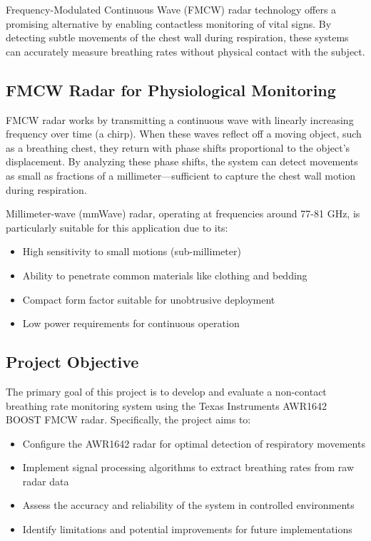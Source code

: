 \documentclass[12pt]{article}
\begin{document}
Frequency-Modulated Continuous Wave (FMCW) radar technology offers a promising alternative by enabling contactless monitoring of vital signs. By detecting subtle movements of the chest wall during respiration, these systems can accurately measure breathing rates without physical contact with the subject.

\subsection{FMCW Radar for Physiological Monitoring}
FMCW radar works by transmitting a continuous wave with linearly increasing frequency over time (a chirp). When these waves reflect off a moving object, such as a breathing chest, they return with phase shifts proportional to the object's displacement. By analyzing these phase shifts, the system can detect movements as small as fractions of a millimeter—sufficient to capture the chest wall motion during respiration.

Millimeter-wave (mmWave) radar, operating at frequencies around 77-81 GHz, is particularly suitable for this application due to its:
\begin{itemize}
    \item High sensitivity to small motions (sub-millimeter)
    \item Ability to penetrate common materials like clothing and bedding
    \item Compact form factor suitable for unobtrusive deployment
    \item Low power requirements for continuous operation
\end{itemize}

\subsection{Project Objective}
The primary goal of this project is to develop and evaluate a non-contact breathing rate monitoring system using the Texas Instruments AWR1642 BOOST FMCW radar. Specifically, the project aims to:
\begin{itemize}
    \item Configure the AWR1642 radar for optimal detection of respiratory movements
    \item Implement signal processing algorithms to extract breathing rates from raw radar data
    \item Assess the accuracy and reliability of the system in controlled environments
    \item Identify limitations and potential improvements for future implementations
\end{itemize}
\end{document}
